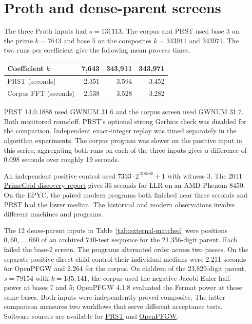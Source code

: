 \documentclass[11pt,a4paper,oneside,openany]{report}
\begin{document}
\section{Proth and dense-parent screens}
The three Proth inputs had $s=131113$. The corpus and PRST used base 3 on the prime $k=7643$ and base 5 on the composites $k=343911$ and $343971$. The two runs per coefficient give the following mean process times.
\begin{center}\small
\begin{tabular}{@{}lrrr@{}}
\toprule
Coefficient $k$ & 7,643 & 343,911 & 343,971\\\midrule
PRST (seconds)&2.351&3.594&3.452\\
Corpus FFT (seconds)&2.538&3.528&3.282\\\bottomrule
\end{tabular}
\end{center}
PRST 14.0.1888 used GWNUM 31.6 and the corpus screen used GWNUM 31.7. Both monitored roundoff. PRST's optional strong Gerbicz check was disabled for the comparison. Independent exact-integer replay was timed separately in the algorithm experiments. The corpus program was slower on the positive input in this series; aggregating both runs on each of the three inputs gives a difference of 0.098 seconds over roughly 19 seconds.

An independent positive control used $7333\cdot 2^{138560}+1$ with witness 3. The 2011 \href{https://www.primegrid.com/download/pps-F138557.pdf}{PrimeGrid discovery report} gives 36 seconds for LLR on an AMD Phenom 8450. On the EPYC, the paired modern programs both finished near three seconds and PRST had the lower median. The historical and modern observations involve different machines and programs.

The 12 dense-parent inputs in Table~\ref{tab:external-matched} were positions $0,60,\ldots,660$ of an archived 740-test sequence for the 21,356-digit parent. Each failed the base-2 screen. The programs alternated order across two passes. On the separate positive direct-child control their individual medians were 2.211 seconds for OpenPFGW and 2.264 for the corpus. On children of the 23,829-digit parent, $s=79154$ with $k=135,141$, the corpus used the negative-Jacobi Euler half-power at bases 7 and 5; OpenPFGW 4.1.8 evaluated the Fermat power at those same bases. Both inputs were independently proved composite. The latter comparison measures two workflows that serve different acceptance tests. Software sources are available for \href{https://github.com/patnashev/prst}{PRST} and \href{https://github.com/primesearch/OpenPFGW}{OpenPFGW}.
\end{document}
